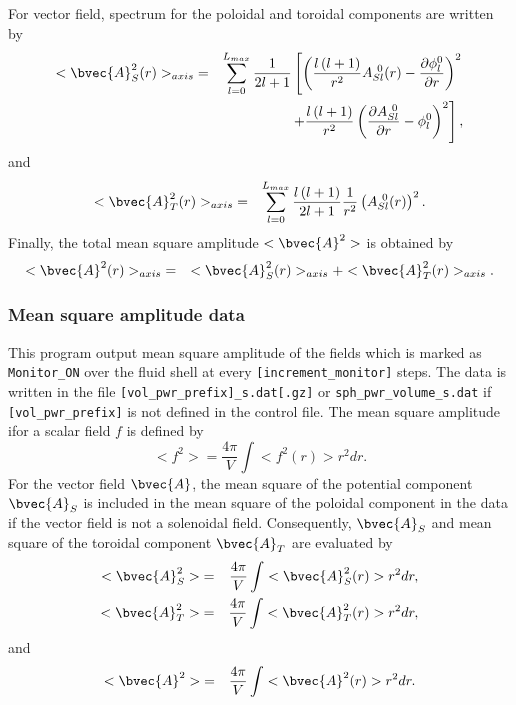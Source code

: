 \begin{description}
%
For vector field, spectrum for the poloidal and toroidal components are written by 
%
\begin{eqnarray}
<\bvec{A}_{S}^{2}(r)>_{axis} &=&   \sum_{l=0}^{L_{max}} \frac{1}{2l + 1}
\left[  \left(\frac{l\left(l+1 \right) }{r^{2}} A_{Sl}^{\ 0}(r) - \frac{\partial \phi_{l}^{0}}{\partial r} \right)^{2} 
\right. \nonumber \\
& & \left. +  \frac{l \left( l+1 \right)}{r^{2}} \left( \frac{\partial A_{Sl}^{\ 0}}{\partial r} - \phi_{l}^{0} \right)^{2} \right],
\end{eqnarray}
%
and
\begin{eqnarray}
<\bvec{A}_{T}^{2}(r)>_{axis} &=&  \sum_{l=0}^{L_{max}} \frac{l \left( l+1 \right)}{2l + 1} \frac{1}{r^{2}} 
\left( A_{Sl}^{\ 0}(r) \right)^{2}.
\end{eqnarray}
Finally, the total mean square amplitude $<\bvec{A}^{2}> $ is obtained by
\begin{eqnarray}
<\bvec{A}^{2}(r)>_{axis} &=& <\bvec{A}_{S}^{2}(r)>_{axis}  + <\bvec{A}_{T}^{2}(r)>_{axis} .
\end{eqnarray}

\end{description}


\subsubsection{Mean square amplitude data}
\label{sec:mean_square}
This program output mean square amplitude of the fields which is marked as \verb|Monitor_ON| over the fluid shell at every \verb|[increment_monitor]| steps. The data is written in the file \verb|[vol_pwr_prefix]_s.dat[.gz]| or  \verb|sph_pwr_volume_s.dat| if \\
{\tt [vol\_pwr\_prefix]} is not defined in the control file. The mean square amplitude ifor a scalar field $f$ is defined by
%
\begin{equation}
<f^{2}> =   \frac{4\pi}{V} \int <f^{2}(r)> r^{2} dr.
\end{equation}
%
For the vector field $\bvec{A}$, the mean square of the potential component $\bvec{A}_{S}$ is included in the mean square of the poloidal component in the data if the vector field is not a solenoidal field. Consequently, $\bvec{A}_{S}$ and mean square of the toroidal component $\bvec{A}_{T}$ are evaluated by 
%
\begin{eqnarray}
<\bvec{A}_{S}^{2}> &=& \frac{4\pi}{V} \int <\bvec{A}_{S}^{2}(r)> r^{2} dr,
\nonumber \\
<\bvec{A}_{T}^{2}>  &=& \frac{4\pi}{V} \int <\bvec{A}_{T}^{2}(r)>  r^{2} dr,
\end{eqnarray}
% 
and
%
\begin{eqnarray}
<\bvec{A}^{2}> &=& \frac{4\pi}{V} \int <\bvec{A}^{2}(r)>  r^{2} dr.
\label{eq:vol_vec_msq}
\end{eqnarray}

